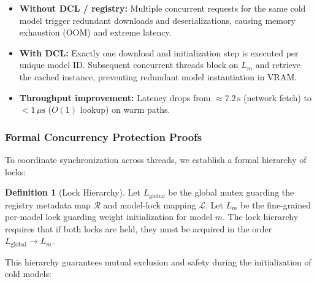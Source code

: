 \documentclass[11pt,a4paper]{article}
\theoremstyle{plain}
\theoremstyle{definition}
\newtheorem{definition}[theorem]{Definition}
\theoremstyle{remark}
\newcommand{\Lm}{L_m}
\newcommand{\Lg}{L_{\mathrm{global}}}
\begin{document}
\begin{impbox}
\begin{itemize}[nosep,leftmargin=1.2em]
  \item \textbf{Without DCL / registry:} Multiple concurrent requests for the same cold model trigger redundant downloads and deserializations, causing memory exhaustion (OOM) and extreme latency.
  \item \textbf{With DCL:} Exactly one download and initialization step is executed per unique model ID. Subsequent concurrent threads block on $\Lm$ and retrieve the cached instance, preventing redundant model instantiation in VRAM.
  \item \textbf{Throughput improvement:} Latency drops from $\approx7.2\,\mathrm{s}$ (network fetch) to $<1\,\mu\mathrm{s}$ ($O(1)$ lookup) on warm paths.
\end{itemize}
\end{impbox}

\subsubsection{Formal Concurrency Protection Proofs}

To coordinate synchronization across threads, we establish a formal hierarchy of locks:

\begin{definition}[Lock Hierarchy]\label{def:locks}
Let $\Lg$ be the global mutex guarding the registry metadata map $\mathcal{R}$ and model-lock mapping $\mathcal{L}$. Let $\Lm$ be the fine-grained per-model lock guarding weight initialization for model $m$. The lock hierarchy requires that if both locks are held, they must be acquired in the order $\Lg \to \Lm$.
\end{definition}

This hierarchy guarantees mutual exclusion and safety during the initialization of cold models:
\end{document}
